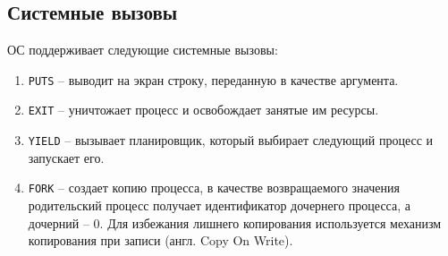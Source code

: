 \subsection{Системные вызовы}
ОС поддерживает следующие системные вызовы:
\begin{enumerate}[1.]
\item \texttt{PUTS} -- выводит на экран строку, переданную в качестве аргумента.
\item \texttt{EXIT} -- уничтожает процесс и освобождает занятые им ресурсы.
\item \texttt{YIELD} -- вызывает планировщик, который выбирает следующий процесс и запускает его.
\item \texttt{FORK} -- создает копию процесса, в качестве возвращаемого значения родительский
	процесс получает идентификатор дочернего процесса, а дочерний -- 0. Для избежания лишнего
	копирования используется механизм копирования при записи (англ. Copy On Write).
\end{enumerate}
